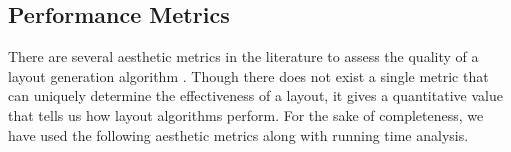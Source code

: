 \documentclass{vgtc}
\newcommand*{\myfont}{\fontfamily{lmtt}\selectfont}
\newcommand{\toolname}{{BatchLayout}}
\newcommand{\toolnameBH}{{BatchLayoutBH}}
\begin{document}



\subsection{Performance Metrics}
\label{sec:aesthetic_measure}
There are several aesthetic metrics in the literature to assess the quality of a layout generation algorithm \cite{purchase2002metrics,kwon2017would,de2019multi}. Though there does not exist a single metric that can uniquely determine the effectiveness of a layout, it gives a quantitative value that tells us how layout algorithms perform. For the sake of completeness, we have used the following aesthetic metrics along with running time analysis.
\end{document}

